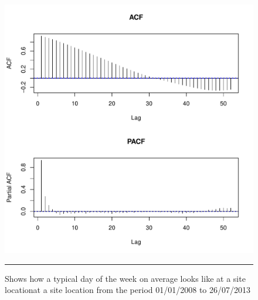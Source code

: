 \begin{figure}[htbp]
  \centering
    \includegraphics[width=\textwidth,height=\textheight,keepaspectratio]{Figures/acf-pacf.pdf}
    \rule{35em}{0.5pt}
  \caption[Plots of ACF and PACF]{Shows how a typical day of the week on
  average looks like at a site locationat a site location from the period 01/01/2008 to 26/07/2013}
  \label{fig:TypicalDayTraffic1}
\end{figure}


